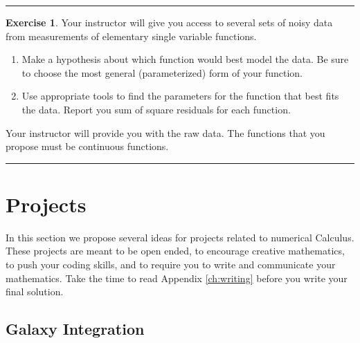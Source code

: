 \documentclass[
]{book}
\theoremstyle{definition}
\theoremstyle{definition}
\theoremstyle{definition}
\newtheorem{exercise}{Exercise}[chapter]
\theoremstyle{remark}
\begin{document}
\begin{center}\rule{0.5\linewidth}{0.5pt}\end{center}

\begin{exercise}
\protect\hypertarget{exr:unnamed-chunk-270}{}{\label{exr:unnamed-chunk-270} }Your instructor will give you access to several sets of noisy data from
measurements of elementary single variable functions.

\begin{enumerate}
\def\labelenumi{\alph{enumi}.}
\item
  Make a hypothesis about which function would best model the data. Be
  sure to choose the most general (parameterized) form of your
  function.
\item
  Use appropriate tools to find the parameters for the function that
  best fits the data. Report you sum of square residuals for each
  function.
\end{enumerate}

Your instructor will provide you with the raw data. The functions that you propose must be continuous functions.
\end{exercise}

\begin{center}\rule{0.5\linewidth}{0.5pt}\end{center}

\hypertarget{projects-1}{%
\section{Projects}\label{projects-1}}

In this section we propose several ideas for projects related to
numerical Calculus. These projects are meant to be open ended, to
encourage creative mathematics, to push your coding skills, and to
require you to write and communicate your mathematics. Take the time to
read Appendix \ref{ch:writing} before you write your final solution.

\hypertarget{galaxy-integration}{%
\subsection{Galaxy Integration}\label{galaxy-integration}}
\end{document}
